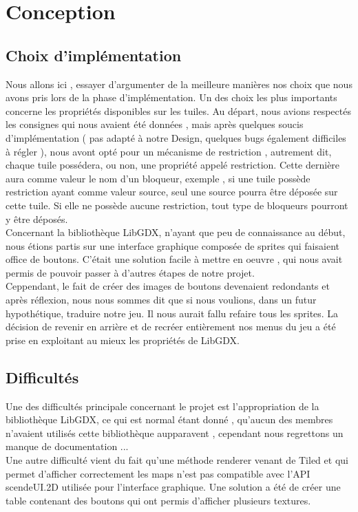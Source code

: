 \documentclass[a4paper,10pt]{article}
\begin{document}
\section{Conception}
\subsection{Choix d'implémentation}
Nous allons ici , essayer d'argumenter de la meilleure manières nos choix que nous avons pris lors de la phase d'implémentation.
Un des choix les plus importants concerne les propriétés disponibles sur les tuiles. Au départ, nous avions respectés les consignes qui nous
avaient été données , mais après quelques soucis d'implémentation ( pas adapté à notre Design, quelques bugs également difficiles à régler ), nous
avont opté pour un mécanisme de restriction , autrement dit, chaque tuile possédera, ou non, une propriété appelé restriction. Cette dernière aura
comme valeur le nom d'un bloqueur, exemple , si une tuile possède restriction ayant comme valeur source, seul une source pourra être déposée sur cette tuile.
Si elle ne possède aucune restriction, tout type de bloqueurs pourront y être déposés. 
\\
Concernant la bibliothèque LibGDX, n'ayant que peu de connaissance au début, nous étions partis sur une interface graphique composée de sprites qui faisaient
office de boutons. C'était une solution facile à mettre en oeuvre , qui nous avait permis de pouvoir passer à d'autres étapes de notre projet.\\
Ceppendant, le fait de créer des images de boutons devenaient redondants et après réflexion, nous nous sommes dit que si nous voulions, dans un futur
hypothétique, traduire notre jeu. Il nous aurait fallu refaire tous les sprites. La décision de revenir en arrière et de recréer entièrement nos menus 
du jeu a été prise en exploitant au mieux les propriétés de LibGDX. 
\subsection{Difficultés}
Une des difficultés principale concernant le projet est l'appropriation de la bibliothèque LibGDX, ce qui est normal étant donné , qu'aucun des membres
n'avaient utilisés cette bibliothèque aupparavent , cependant nous regrettons un manque de documentation ...
\\
Une autre difficulté vient du fait qu'une méthode renderer venant de Tiled et qui permet d'afficher correctement les maps n'est pas compatible avec
l'API scendeUI.2D utilisée pour l'interface graphique. Une solution a été de créer une table contenant des boutons qui ont permis d'afficher plusieurs
textures. 
\end{document}
